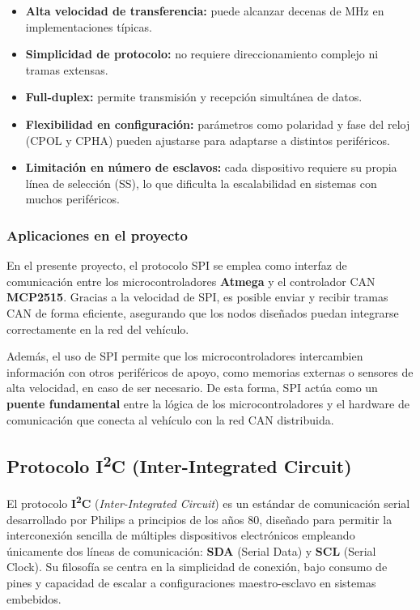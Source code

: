 \begin{itemize}
    \item \textbf{Alta velocidad de transferencia:} puede alcanzar decenas de MHz en implementaciones típicas.
    \item \textbf{Simplicidad de protocolo:} no requiere direccionamiento complejo ni tramas extensas.
    \item \textbf{Full-duplex:} permite transmisión y recepción simultánea de datos.
    \item \textbf{Flexibilidad en configuración:} parámetros como polaridad y fase del reloj (CPOL y CPHA) pueden ajustarse para adaptarse a distintos periféricos.
    \item \textbf{Limitación en número de esclavos:} cada dispositivo requiere su propia línea de selección (SS), lo que dificulta la escalabilidad en sistemas con muchos periféricos.
\end{itemize}

\subsubsection*{Aplicaciones en el proyecto}

En el presente proyecto, el protocolo SPI se emplea como interfaz de comunicación entre los microcontroladores \textbf{Atmega} y el controlador CAN \textbf{MCP2515}. Gracias a la velocidad de SPI, es posible enviar y recibir tramas CAN de forma eficiente, asegurando que los nodos diseñados puedan integrarse correctamente en la red del vehículo.

Además, el uso de SPI permite que los microcontroladores intercambien información con otros periféricos de apoyo, como memorias externas o sensores de alta velocidad, en caso de ser necesario. De esta forma, SPI actúa como un \textbf{puente fundamental} entre la lógica de los microcontroladores y el hardware de comunicación que conecta al vehículo con la red CAN distribuida.

\subsection{Protocolo I\textsuperscript{2}C (Inter-Integrated Circuit)}
El protocolo \textbf{I\textsuperscript{2}C} (\textit{Inter-Integrated Circuit}) es un estándar de comunicación serial desarrollado por Philips a principios de los años 80, diseñado para permitir la interconexión sencilla de múltiples dispositivos electrónicos empleando únicamente dos líneas de comunicación: \textbf{SDA} (Serial Data) y \textbf{SCL} (Serial Clock). Su filosofía se centra en la simplicidad de conexión, bajo consumo de pines y capacidad de escalar a configuraciones maestro-esclavo en sistemas embebidos.


